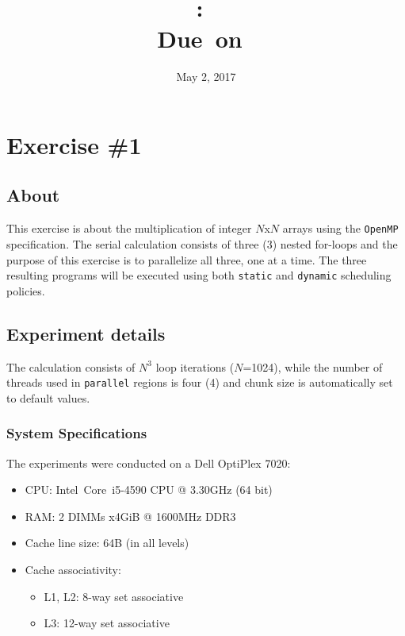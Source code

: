 \documentclass{article}
\title{
\vspace{2in}
\textmd{\textbf{\hmwkClass:\ \hmwkTitle}}\\
\normalsize\vspace{0.1in}\small{Due\ on\ \hmwkDueDate}\\
\vspace{0.1in}\large{\textit{\hmwkClassInstructor}}
\vspace{3in}
}
\author{\textbf{\hmwkAuthorName}}
\date{May 2, 2017} %
\def\code#1{\texttt{#1}}
\begin{document}
\maketitle


\newpage
\tableofcontents
\newpage



\section{Exercise \#1}

\subsection{About}
This exercise is about the multiplication of integer $N$x$N$ arrays using the \texttt{OpenMP}
specification. The serial calculation consists of three (3) nested for-loops and the purpose of
this exercise is to parallelize all three, one at a time. The three resulting programs will be
executed using both \code{static} and \code{dynamic} scheduling policies.

\subsection{Experiment details}
The calculation consists of $N^3$ loop iterations ($N$=1024), while the number of threads
used in \code{parallel} regions is four (4) and chunk size is automatically set to default
values.

\subsubsection{System Specifications}
The experiments were conducted on a Dell OptiPlex 7020:
\begin{itemize}
 \item CPU: Intel\textregistered \ Core\texttrademark \ i5-4590 CPU @ 3.30GHz (64 bit)
 \item RAM: 2 DIMMs x4GiB @ 1600MHz DDR3
 \item Cache line size: 64B (in all levels)
 \item Cache associativity:
 \begin{itemize}
  \item L1, L2: 8-way set associative
  \item L3: 12-way set associative
 \end{itemize}
\end{itemize}
\end{document}
